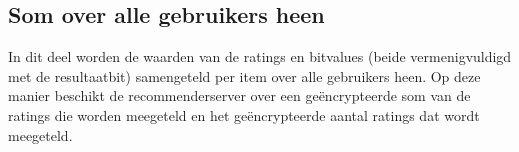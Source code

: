 \subsection{Som over alle gebruikers heen}
\label{sumoverallusers}

In dit deel worden de waarden van de ratings en bitvalues (beide vermenigvuldigd met de resultaatbit) samengeteld per item over alle gebruikers heen. Op deze manier beschikt de recommenderserver over een ge\"encrypteerde som van de ratings die worden meegeteld en het ge\"encrypteerde aantal ratings dat wordt meegeteld.
